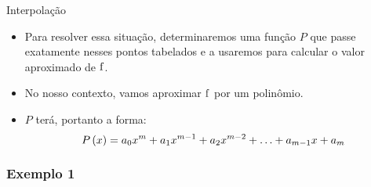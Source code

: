 \begin{frame}{Interpolação}

\begin{itemize}[<+->]
  \item Para resolver essa situação, determinaremos uma função $P$ que passe exatamente nesses pontos tabelados e a usaremos para calcular o valor aproximado de $\mathrm{f}$.
  \item No nosso contexto, vamos aproximar $\mathrm{f}$ por um polinômio.
  \item $P$ terá, portanto a forma:
\[
P\left(x\right) = a_0 x^m + a_1 x^{m-1} + a_2 x^{m-2} + \ldots + a_{m-1} x + a_m
\]
\end{itemize}

\end{frame}

\subsubsection{Exemplo 1}


